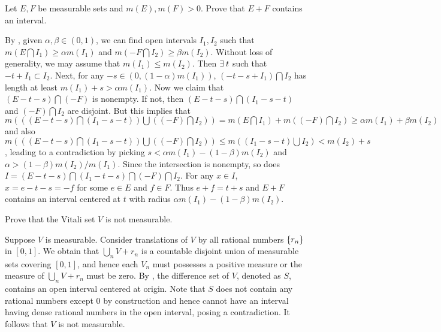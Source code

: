 \begin{exercise}
    Let $E,F$ be measurable sets and $m(E),m(F)>0$. Prove that 
    $E+F$ contains an interval. 
\end{exercise}
\begin{pf}
    By , given $\alpha,\beta\in (0,1)$, we can find 
    open intervals $I_1, I_2$ such that $m(E\bigcap I_1)\geq
    \alpha m(I_1)$ and $m(-F\bigcap I_2)\geq\beta m(I_2)$. 
    Without loss of generality, we may assume that $m(I_1)\leq 
    m(I_2)$. Then $\exists\: t$ such that $-t+I_1\subset I_2$. Next, 
    for any $-s\in (0,(1-\alpha)m(I_1))$, $(-t-s+I_1)\bigcap I_2$ 
    has length at least $m(I_1)+s>\alpha m(I_1)$. Now we claim 
    that $(E-t-s)\bigcap (-F)$ is nonempty. If not, then $(E-t-s)
    \bigcap(I_1-s-t)$ and $(-F)\bigcap I_2$ are disjoint. But 
    this implies that $m(((E-t-s)\bigcap(I_1-s-t))\bigcup 
    ((-F)\bigcap I_2)) = m(E\bigcap I_1)+m((-F)\bigcap I_2)
    \geq \alpha m(I_1)+\beta m(I_2)$ and also $m(((E-t-s)\bigcap
    (I_1-s-t))\bigcup ((-F)\bigcap I_2))\leq m((I_1-s-t)\bigcup 
    I_2) < m(I_2)+s$, leading to a contradiction by picking 
    $s<\alpha m(I_1)-(1-\beta)m(I_2)$ and $\alpha > 
    (1-\beta)m(I_2)/m(I_1)$. Since the intersection is nonempty, 
    so does $I = (E-t-s)\bigcap(I_1-t-s)\bigcap(-F)\bigcap I_2$. 
    For any $x\in I$, $x = e-t-s = -f$ for some $e\in E$ and 
    $f\in F$. Thus $e+f = t+s$ and $E+F$ contains an interval 
    centered at $t$ with radius $\alpha m(I_1)-(1-\beta)m(I_2)$.
\end{pf}

\begin{exercise}
    Prove that the Vitali set $V$ is not measurable.
\end{exercise}
\begin{pf}
    Suppose $V$ is measurable. Consider translations of $V$ 
    by all rational numbers $\left\{ {r_n} \right\}$ in $[0,1]$. We obtain 
    that $\bigcup_n V+r_n$ is a countable disjoint union of 
    measurable sets covering $[0,1]$, and hence each $V_n$ must 
    possesses a positive measure or the measure of $\bigcup_n 
    V+r_n$ must be zero. By , the difference set 
    of $V$, denoted as $S$, contains an open interval centered 
    at origin. Note that $S$ does not contain any rational 
    numbers except $0$ by construction and hence cannot have 
    an interval having dense rational numbers in the open 
    interval, posing a contradiction. It follows that $V$ is 
    not measurable.
\end{pf}

